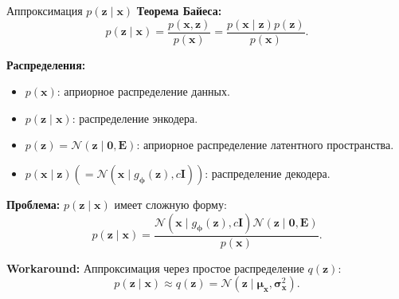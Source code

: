 \begin{frame}[allowframebreaks]{Аппроксимация $p(\boldsymbol{z} \mid \boldsymbol{x})$}
    \textbf{Теорема Байеса:}
    \begin{equation*}
        p(\boldsymbol{z} \mid \boldsymbol{x}) = \frac{p(\boldsymbol{x}, \boldsymbol{z})}{p(\boldsymbol{x})} = \frac{p(\boldsymbol{x} \mid \boldsymbol{z}) p(\boldsymbol{z})}{p(\boldsymbol{x})}.
    \end{equation*}

    \textbf{Распределения:}
    \begin{itemize}
        \item $p(\boldsymbol{x})$: априорное распределение данных.
        \item $p(\boldsymbol{z} \mid \boldsymbol{x})$: распределение энкодера.
        \item $p(\boldsymbol{z}) = \mathcal{N}(\boldsymbol{z} \mid \mathbf{0}, \mathbf{E})$: априорное распределение латентного пространства.
        \item $p(\boldsymbol{x} \mid \boldsymbol{z}) \left(= \mathcal{N}(\boldsymbol{x} \mid g_{\boldsymbol{\phi}}(\boldsymbol{z}), c\mathbf{I})\right)$: распределение декодера.
    \end{itemize}

    \framebreak

    \textbf{Проблема:} $p(\boldsymbol{z} \mid \boldsymbol{x})$ имеет сложную форму:
    \begin{equation*}
        p(\boldsymbol{z} \mid \boldsymbol{x}) = \frac{\mathcal{N}(\boldsymbol{x} \mid g_{\boldsymbol{\phi}}(\boldsymbol{z}), c\mathbf{I}) \mathcal{N}(\boldsymbol{z} \mid \mathbf{0}, \mathbf{E})}{p(\boldsymbol{x})}.
    \end{equation*}

    \textbf{Workaround:} Аппроксимация через простое распределение $q(\boldsymbol{z})$:
    \begin{equation*}
        p(\boldsymbol{z} \mid \boldsymbol{x}) \approx q(\boldsymbol{z}) = \mathcal{N}(\boldsymbol{z} \mid \boldsymbol{\mu}_{\boldsymbol{x}}, \boldsymbol{\sigma}_{\boldsymbol{x}}^2).
    \end{equation*}
\end{frame}

